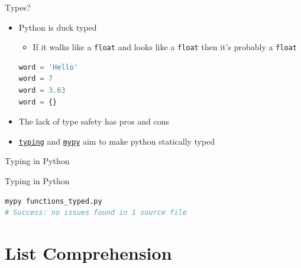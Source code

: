 \documentclass[aspectratio=169,xcolor=dvipsnames]{beamer}
\begin{document}
\begin{frame}[fragile]{Types?}
  \begin{itemize}
    \item Python is duck typed
    \begin{itemize}
        \item If it walks like a \texttt{float} and looks like a \texttt{float} then it's probably a \texttt{float}
    \end{itemize}
    \begin{example}
        \begin{lstlisting}[language=Python]
word = 'Hello'
word = 7
word = 3.63
word = {}
        \end{lstlisting}
    \end{example}
    \item The lack of type safety has pros and cons
    \item \href{https://docs.python.org/3/library/typing.html}{\texttt{typing}} and \href{http://mypy-lang.org/}{\texttt{mypy}} aim to make python statically typed
  \end{itemize}
\end{frame}


\begin{frame}[fragile]{Typing in Python}
  \begin{example}
    
  \end{example}
\end{frame}

\begin{frame}[fragile]{Typing in Python}
  \begin{example}
    \begin{lstlisting}[language=bash, otherkeywords={mypy}]
mypy functions_typed.py
# Success: no issues found in 1 source file
    \end{lstlisting}
  \end{example}
\end{frame}



\section{List Comprehension}
\end{document}

